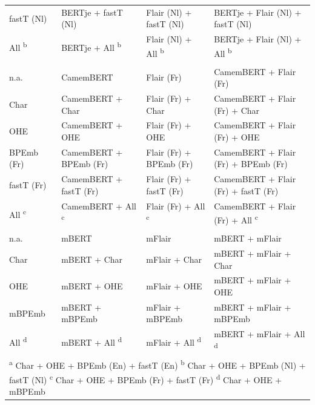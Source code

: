 \documentclass[12pt,a4paper,]{book}
\begin{document}
\begin{landscape}
\begin{table}
\begin{tabular}[t]{llll}
\hspace{1em}fastT (Nl) & BERTje + fastT (Nl) & Flair (Nl) + fastT (Nl) & BERTje + Flair (Nl) + fastT (Nl)\\
\hspace{1em}All \textsuperscript{b} & BERTje + All \textsuperscript{b} & Flair (Nl) + All \textsuperscript{b} & BERTje + Flair (Nl) + All \textsuperscript{b}\\
\addlinespace[0.3em]
\multicolumn{4}{l}{\textbf{French}}\\
\hspace{1em}n.a. & CamemBERT & Flair (Fr) & CamemBERT + Flair (Fr)\\
\hspace{1em}Char & CamemBERT + Char & Flair (Fr) + Char & CamemBERT + Flair (Fr) + Char\\
\hspace{1em}OHE & CamemBERT + OHE & Flair (Fr) + OHE & CamemBERT + Flair (Fr) + OHE\\
\hspace{1em}BPEmb (Fr) & CamemBERT + BPEmb (Fr) & Flair (Fr) + BPEmb (Fr) & CamemBERT + Flair (Fr) + BPEmb (Fr)\\
\hspace{1em}fastT (Fr) & CamemBERT + fastT (Fr) & Flair (Fr) + fastT (Fr) & CamemBERT + Flair (Fr) + fastT (Fr)\\
\hspace{1em}All \textsuperscript{c} & CamemBERT + All \textsuperscript{c} & Flair (Fr) + All \textsuperscript{c} & CamemBERT + Flair (Fr) + All \textsuperscript{c}\\
\addlinespace[0.3em]
\multicolumn{4}{l}{\textbf{Multilingual}}\\
\hspace{1em}n.a. & mBERT & mFlair & mBERT + mFlair\\
\hspace{1em}Char & mBERT + Char & mFlair + Char & mBERT + mFlair + Char\\
\hspace{1em}OHE & mBERT + OHE & mFlair + OHE & mBERT + mFlair + OHE\\
\hspace{1em}mBPEmb & mBERT + mBPEmb & mFlair + mBPEmb & mBERT + mFlair + mBPEmb\\
\hspace{1em}All \textsuperscript{d} & mBERT + All \textsuperscript{d} & mFlair + All \textsuperscript{d} & mBERT + mFlair + All \textsuperscript{d}\\
\bottomrule
\multicolumn{4}{l}{\textsuperscript{a} Char + OHE + BPEmb (En) + fastT (En) \textsuperscript{b} Char + OHE + BPEmb (Nl) + fastT (Nl) \textsuperscript{c} Char + OHE + BPEmb (Fr) + fastT (Fr) \textsuperscript{d} Char + OHE + mBPEmb}\\
\end{tabular}
\end{table}
\end{landscape}
\end{document}
